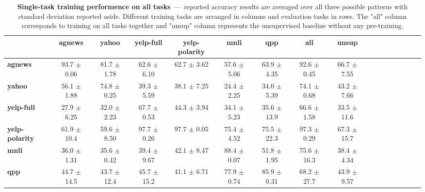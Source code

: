 \begin{table*}[h]
	\centering
	\fontsize{9}{13}
	\selectfont
	\begin{tabular}{lcccccccccccccccc}
		\toprule
		& \textbf{agnews}    & \textbf{yahoo}    & \textbf{yelp-full}    & \textbf{yelp-polarity}    & \textbf{mnli}    & \textbf{qpp}    & \textbf{all}    & \textbf{unsup}    \\ \hline
		\textbf{agnews}        & 93.7   \tiny$\pm$ 0.06      & 81.7   \tiny$\pm$ 1.78      & 62.6      \tiny$\pm$ 6.10      & 62.7          \tiny$\pm$ 3.62      & 57.6 \tiny$\pm$ 5.06      & 63.9 \tiny$\pm$ 4.35      & 92.6 \tiny$\pm$ 0.45      & 66.7   \tiny$\pm$ 7.55      \\
		\textbf{yahoo}         & 56.1    \tiny$\pm$ 1.88      & 74.8   \tiny$\pm$ 0.25      & 39.3       \tiny$\pm$ 5.59      & 38.1           \tiny$\pm$ 7.25      & 24.4  \tiny$\pm$ 2.25      & 34.0 \tiny$\pm$ 5.39      & 74.1 \tiny$\pm$ 0.68      & 43.2   \tiny$\pm$ 7.66      \\
		\textbf{yelp-full}     & 27.9    \tiny$\pm$ 6.25      & 32.0   \tiny$\pm$ 2.23      & 67.7       \tiny$\pm$ 0.53      & 44.3           \tiny$\pm$ 3.94      & 34.1  \tiny$\pm$ 5.23      & 35.6 \tiny$\pm$ 13.9      & 66.6 \tiny$\pm$ 1.58      & 33.5   \tiny$\pm$ 11.6      \\
		\textbf{yelp-polarity} & 61.9    \tiny$\pm$ 10.4      & 59.6   \tiny$\pm$ 8.50      & 97.7       \tiny$\pm$ 0.26      & 97.7           \tiny$\pm$ 0.05      & 75.4  \tiny$\pm$ 4.52      & 75.5 \tiny$\pm$ 22.3      & 97.3 \tiny$\pm$ 0.29      & 67.3   \tiny$\pm$ 15.7      \\
		\textbf{mnli}          & 36.0    \tiny$\pm$ 1.31      & 35.6   \tiny$\pm$ 0.42      & 39.4       \tiny$\pm$ 9.67      & 42.1           \tiny$\pm$ 8.47      & 88.4  \tiny$\pm$ 0.07      & 51.8 \tiny$\pm$ 1.95      & 75.6 \tiny$\pm$ 16.3      & 38.4   \tiny$\pm$ 4.34      \\
		\textbf{qpp}           & 44.7    \tiny$\pm$ 14.5      & 43.7   \tiny$\pm$ 12.4      & 45.7       \tiny$\pm$ 15.2      & 41.1           \tiny$\pm$ 6.71      & 77.9  \tiny$\pm$ 0.74      & 85.9 \tiny$\pm$ 0.31      & 68.2 \tiny$\pm$ 27.7      & 43.9   \tiny$\pm$ 9.57      \\ \bottomrule
	\end{tabular}
	\caption{\textbf{Single-task training performence on all tasks}~---~reported accuracy results are averaged over all three possible patterns with standard deviation reported aside. Different training tasks are arranged in columns and evaluation tasks in rows. The "all" column corresponds to training on all tasks together and "unsup" column represents the unsupervised baseline without any pre-training.}\label{tab:single-on-train-set-summary}
\end{table*}
